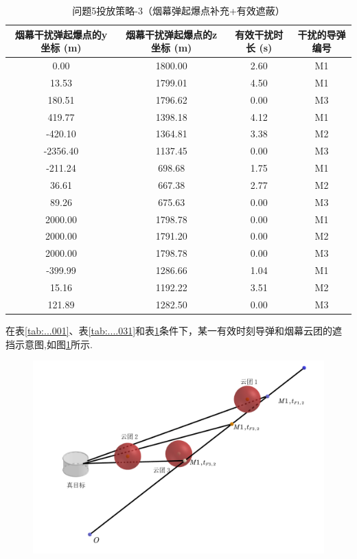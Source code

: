 \documentclass[../main.tex]{subfiles}
\begin{document}
\begin{table}[H]
\caption{问题5投放策略-3（烟幕弹起爆点补充+有效遮蔽）}
\label{tab:....032} 
\centering
\begin{scriptsize}
\begin{tabular}{cccc}
\toprule[1.5pt]
烟幕干扰弹起爆点的y坐标 (m) & 烟幕干扰弹起爆点的z坐标 (m) & 有效干扰时长 (s) & 干扰的导弹编号 \\
\midrule[1pt]
0.00  & 1800.00 & 2.60 & M1 \\  %
13.53 & 1799.01 & 4.50 & M1 \\  %
180.51& 1796.62 & 0.00 & M3  \\  %
419.77& 1398.18 & 4.12 & M1 \\  %
-420.10&1364.81 & 3.38 & M2 \\  %
-2356.40&1137.45& 0.00 & M3  \\  %
-211.24& 698.68 & 1.75 & M1 \\  %
36.61  & 667.38 & 2.77 & M2 \\  %
89.26  & 675.63 & 0.00 & M3 \\  %
2000.00& 1798.78 & 0.00 & M1  \\  %
2000.00& 1791.20 & 0.00 & M2 \\  %
2000.00& 1798.78 & 0.00 & M3 \\  %
-399.99& 1286.66 & 1.04 & M1 \\  %
15.16  & 1192.22 & 3.51 & M2 \\  %
121.89 & 1282.50 & 0.00 & M3 \\  %
\bottomrule[1.5pt]
\end{tabular}
\end{scriptsize}
\end{table}

在表\ref{tab:...001}、表\ref{tab:....031}和表\ref{tab:....032}条件下，某一有效时刻导弹和烟幕云团的遮挡示意图,如图\ref{图----3}所示.

\begin{figure}[H]
\centering
\includegraphics[scale=0.5]{图三.png}
\caption{}
\label{图----3}
\end{figure}
\end{document}
